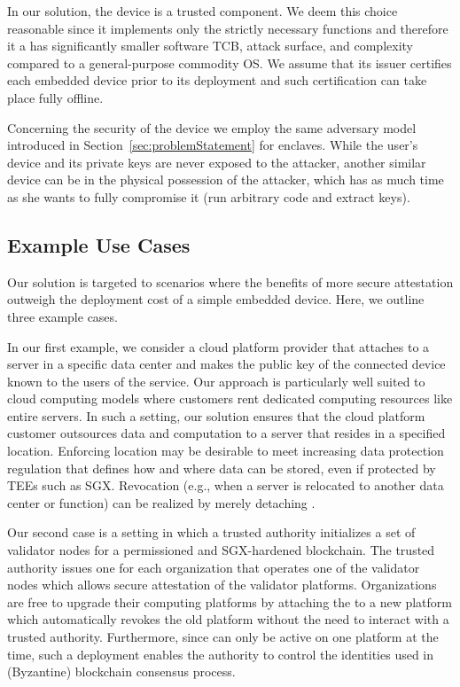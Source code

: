 In our solution, the \device device is a trusted component. We deem this choice reasonable since it implements only the strictly necessary functions and therefore it a has significantly smaller software TCB, attack surface, and complexity compared to a general-purpose commodity OS. We assume that its issuer certifies each embedded device prior to its deployment and such certification can take place fully offline.

Concerning the security of the \device device we employ the same adversary model introduced in Section~\ref{sec:problemStatement} for enclaves. While the user's device and its private keys are never exposed to the attacker, another similar device can be in the physical possession of the attacker, which has as much time as she wants to fully compromise it (run arbitrary code and extract keys). 


\subsection{Example Use Cases}
\label{sec:use-cases}

Our solution is targeted to scenarios where the benefits of more secure attestation outweigh the deployment cost of a simple embedded device. Here, we outline three example cases.  

 In our first example, we consider a cloud platform provider that attaches \device to a server in a specific data center and makes the public key of the connected device known to the users of the service. Our approach is particularly well suited to cloud computing models where customers rent dedicated computing resources like entire servers. In such a setting, our solution ensures that the cloud platform customer outsources data and computation to a server that resides in a specified location. Enforcing location may be desirable to meet increasing data protection regulation that defines how and where data can be stored, even if protected by TEEs such as SGX. Revocation (e.g., when a server is relocated to another data center or function) can be realized by merely detaching \device.

 Our second case is a setting in which a trusted authority initializes a set of validator nodes for a permissioned and SGX-hardened blockchain. 
The trusted authority issues one \device for each organization that operates one of the validator nodes which allows secure attestation of the validator platforms. Organizations are free to upgrade their computing platforms by attaching the \device to a new platform which automatically revokes the old platform without the need to interact with a trusted authority. Furthermore, since \device can only be active on one platform at the time, such a deployment enables the authority to control the identities used in (Byzantine) blockchain consensus process.



